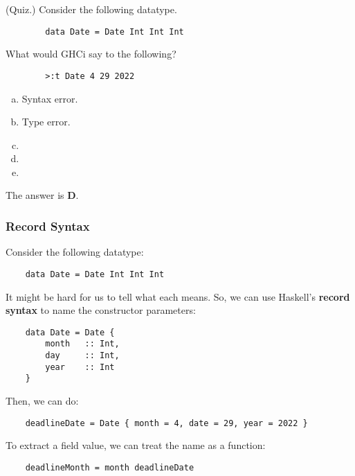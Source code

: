 \documentclass[letterpaper]{article}
\begin{document}
\begin{mdframed}[]
    (Quiz.) Consider the following datatype. 
    \begin{verbatim}
        data Date = Date Int Int Int \end{verbatim}
    What would GHCi say to the following?  
    \begin{verbatim}
        >:t Date 4 29 2022\end{verbatim}
    
    \begin{enumerate}[(a)]
        \item Syntax error. 
        \item Type error. 
        \item {}
        \item {}
        \item {}
    \end{enumerate}

    \begin{mdframed}[]
        The answer is \textbf{D}. 
    \end{mdframed}
\end{mdframed}

\subsubsection{Record Syntax}
Consider the following datatype: 
\begin{verbatim}
    data Date = Date Int Int Int \end{verbatim}
It might be hard for us to tell what each  means. So, we can use Haskell's \textbf{record syntax} to name the constructor parameters:
\begin{verbatim}
    data Date = Date {
        month   :: Int, 
        day     :: Int, 
        year    :: Int 
    }\end{verbatim}
Then, we can do:
\begin{verbatim}
    deadlineDate = Date { month = 4, date = 29, year = 2022 }\end{verbatim}
To extract a field value, we can treat the name as a function: 
\begin{verbatim}
    deadlineMonth = month deadlineDate\end{verbatim}
\end{document}

